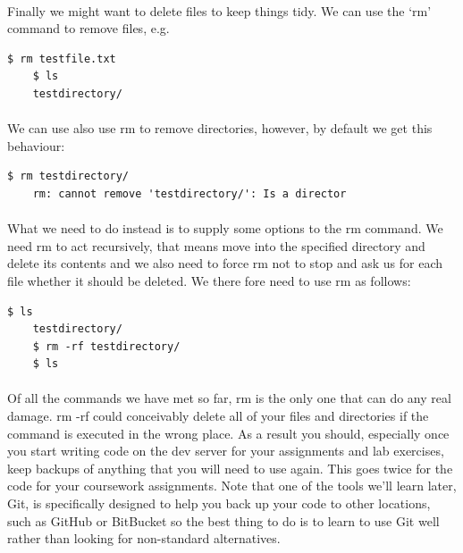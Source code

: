 \documentclass[12pt, a4paper, oneside]{book}
\begin{document}
\paragraph{} Finally we might want to delete files to keep things tidy. We can use the `rm' command to remove files, e.g.

\begin{lstlisting}[style=DOS]
    $ rm testfile.txt 
    $ ls
    testdirectory/
\end{lstlisting}

\paragraph{} We can use also use rm to remove directories, however, by default we get this behaviour:

\begin{lstlisting}[style=DOS]
    $ rm testdirectory/
    rm: cannot remove 'testdirectory/': Is a director
\end{lstlisting}

\paragraph{} What we need to do instead is to supply some options to the rm command. We need rm to act recursively, that means move into the specified directory and delete its contents and we also need to force rm not to stop and ask us for each file whether it should be deleted. We there fore need to use rm as follows:
\begin{lstlisting}[style=DOS]
    $ ls
    testdirectory/
    $ rm -rf testdirectory/
    $ ls

\end{lstlisting}

\paragraph{} Of all the commands we have met so far, rm is the only one that can do any real damage. rm -rf could conceivably delete all of your files and directories if the command is executed in the wrong place. As a result you should, especially once you start writing code on the dev server for your assignments and lab exercises, keep backups of anything that you will need to use again. This goes twice for the code for your coursework assignments. Note that one of the tools we'll learn later, Git, is specifically designed to help you back up your code to other locations, such as GitHub or BitBucket so the best thing to do is to learn to use Git well rather than looking for non-standard alternatives.
\end{document}

